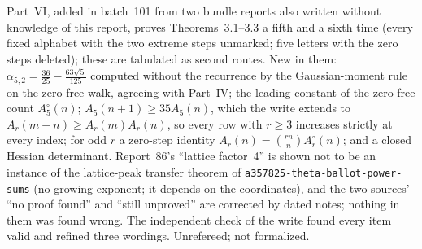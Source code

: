 \documentclass[11pt]{article}
\newcommand{\dir}[1]{\texttt{#1}}
\begin{document}
{Part~VI, added in batch~101 from two bundle reports also written without
knowledge of this report, proves Theorems~3.1--3.3 a fifth and a sixth time
(every fixed alphabet with the two extreme steps unmarked; five letters
with the zero steps deleted); these are tabulated as second routes.  New in
them: $\alpha_{5,2}=\frac{36}{25}-\frac{63\sqrt5}{125}$ computed without the
recurrence by the Gaussian-moment rule on the zero-free walk, agreeing with
Part~IV; the leading constant of the zero-free count $A^\circ_5(n)$; $A_5(n+1)\ge35A_5(n)$,
which the write extends to $A_r(m+n)\ge A_r(m)A_r(n)$, so every row with
$r\ge3$ increases strictly at every index; for odd $r$ a zero-step identity
$A_r(n)=\binom{rn}{n}A^\circ_r(n)$; and a closed Hessian determinant.  Report~86's
``lattice factor~4'' is shown not to be an instance of the
lattice-peak transfer theorem of \dir{a357825-theta-ballot-power-sums} (no
growing exponent; it depends on the coordinates), and the two sources' ``no proof
found'' and ``still unproved'' are corrected by dated notes; nothing in them
was found wrong.  The independent check of the write found every item valid
and refined three wordings.  Unrefereed; not formalized.}
\end{document}
